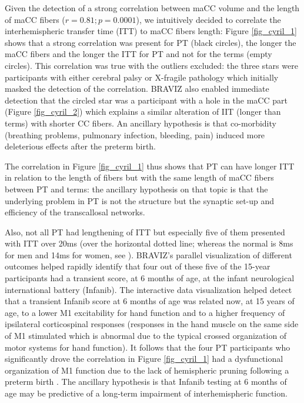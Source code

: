 \documentclass{frontiersHLTH}
\begin{document}
Given the detection of a strong correlation between maCC volume and the length of maCC fibers ($r=0.81; p=0.0001$), we intuitively decided to correlate the interhemispheric transfer time (ITT) to maCC fibers length: Figure \ref{fig_cyril_1} shows that a strong correlation was present for PT (black circles), the longer the maCC fibers and the longer the ITT for PT and not for the terms (empty circles). This correlation was true with the outliers excluded: the three stars were participants with either cerebral palsy or X-fragile pathology which initially masked the detection of the correlation. BRAVIZ also enabled  immediate detection that the circled star was a participant with a hole in the maCC part (Figure \ref{fig_cyril_2}) which explains a similar alteration of IIT (longer than terms) with shorter CC fibers. An ancillary hypothesis is that co-morbidity (breathing problems, pulmonary infection, bleeding, pain) induced more deleterious effects after the preterm birth.


The correlation in Figure \ref{fig_cyril_1} thus shows that PT can have longer ITT in relation to the length of fibers but with the same length of maCC fibers between PT and terms: the ancillary hypothesis on that topic is that the underlying problem in PT is not the structure but the synaptic set-up and efficiency of the transcallosal networks.

Also, not all PT had lengthening of ITT but especially five of them presented with ITT over 20ms (over the horizontal dotted line; whereas the normal is 8ms for men and 14ms for women, see \cite{schneider_cerebral_2012}). BRAVIZ’s parallel visualization of different outcomes helped rapidly identify that four out of these five of the 15-year participants had a transient score, at 6 months of age, at the infant neurological international battery (Infanib). 
The interactive data visualization helped detect that a transient Infanib score at 6 months of age was related now, at 15 years of age, to a lower M1 excitability for hand function and to a higher frequency of ipsilateral corticospinal responses (responses in the hand muscle on the same side of M1 stimulated which is abnormal due to the typical crossed organization of motor systems for hand function). It follows that the four PT participants who significantly drove the correlation in Figure \ref{fig_cyril_1} had a dysfunctional organization of M1 function due to the lack of hemispheric pruning following a preterm birth \cite{schneider_cerebral_2012}. The ancillary hypothesis is that Infanib testing at 6 months of age may be predictive of a long-term impairment of interhemispheric function.
\end{document}

